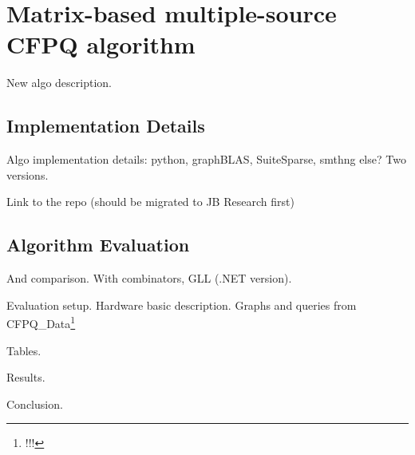 \section{Matrix-based multiple-source CFPQ algorithm}

New algo description.

\subsection{Implementation Details}

Algo implementation details: python, graphBLAS, SuiteSparse, smthng else? Two versions.

Link to the repo (should be migrated to JB Research first)

\subsection{Algorithm Evaluation}

And comparison. With combinators, GLL (.NET version).

Evaluation setup.
Hardware basic description.
Graphs and queries from CFPQ\_Data\footnote{!!!}

Tables.

Results.

Conclusion. 